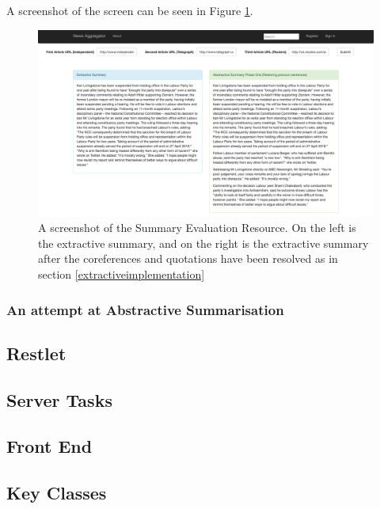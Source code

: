 \documentclass[12pt]{article}
\begin{document}
A screenshot of the screen can be seen in Figure \ref{summaryevaluationresource}.

\begin{figure}[ht!]
  \centering
    \includegraphics[scale=0.3]{SummaryEvaluationResource}
   \caption[A screenshot of the Summary Evaluation Resource]{A screenshot of the Summary Evaluation Resource. On the left is the extractive summary, and on the right is the extractive summary after the coreferences and quotations have been resolved as in section \ref{extractiveimplementation}}
   \label{summaryevaluationresource}
\end{figure} 

\subsubsection{An attempt at Abstractive Summarisation}

\label{abstractiveimplementation}



\subsection{Restlet}

\subsection{Server Tasks}

\subsection{Front End}

\label{frontendimplementation}

\subsection{Key Classes}
\end{document}

